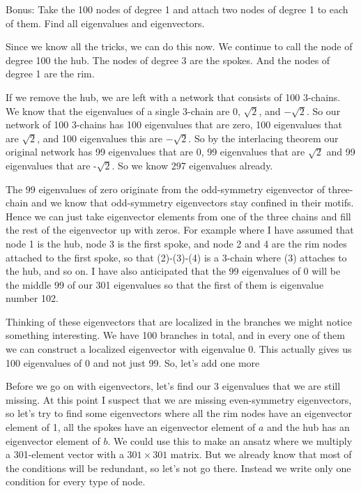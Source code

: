 \subquestion 
Bonus: Take the 100 nodes of degree 1 and attach two nodes of degree 1 to each of them. Find all eigenvalues and eigenvectors. 

\solution
Since we know all the tricks, we can do this now. We continue to call the node of degree 100 the hub. The nodes of degree 3 are the spokes. And the nodes of degree 1 are the rim. 

If we remove the hub, we are left with a network that consists of 100 3-chains. We know that the eigenvalues of a single 3-chain are $0$, $\sqrt{2}$, and $-\sqrt{2}$. So our network of 100 3-chains has 100 eigenvalues that are zero, 100 eigenvalues that are $\sqrt{2}$, and 100 eigenvalues this are $-\sqrt{2}$. So by the interlacing theorem our original network has 99 eigenvalues that are 0, 99 eigenvalues that are $\sqrt{2}$ and 99 eigenvalues that are -$\sqrt{2}$. So we know 297 eigenvalues already. 

The 99 eigenvalues of zero originate from the odd-symmetry eigenvector of three-chain and we know that odd-symmetry eigenvectors stay confined in their motifs. Hence we can just take eigenvector elements from one of the three chains and fill the rest of the eigenvector up with zeros. For example 
where I have assumed that node 1 is the hub, node 3 is the first spoke, and node 2 and 4 are the rim nodes attached to the first spoke, so that (2)-(3)-(4) is a 3-chain where (3) attaches to the hub, and so on. I have also anticipated that the 99 eigenvalues of 0 will be the middle 99 of our 301 eigenvalues so that the first of them is eigenvalue number 102. 

Thinking of these eigenvectors that are localized in the branches we might notice something interesting. We have 100 branches in total, and in every one of them we can construct a localized eigenvector with eigenvalue 0. This actually gives us 100 eigenvalues of 0 and not just 99. So, let's add one more 

Before we go on with eigenvectors, let's find our 3 eigenvalues that we are still missing. At this point I suspect that we are missing even-symmetry eigenvectors, so let's try to find some eigenvectors where all the rim nodes have an eigenvector element of 1, all the spokes have an eigenvector element of $a$ and the hub has an eigenvector element of $b$. We could use this to make an ansatz where we multiply a 301-element vector with a $301 \times 301$ matrix. But we already know that most of the conditions will be redundant, so let's not go there. Instead we write only one condition for every type of node.

